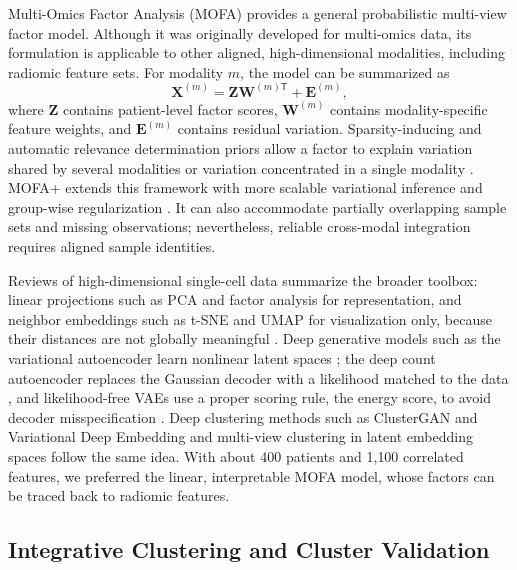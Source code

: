 \documentclass[conference]{IEEEtran}
\begin{document}
Multi-Omics Factor Analysis (MOFA) provides a general probabilistic multi-view factor model. Although it was originally developed for multi-omics data, its formulation is applicable to other aligned, high-dimensional modalities, including radiomic feature sets. For modality $m$, the model can be summarized as
\begin{equation}
    \mathbf{X}^{(m)} = \mathbf{Z}\mathbf{W}^{(m)\mathsf{T}} + \mathbf{E}^{(m)},
\end{equation}
where $\mathbf{Z}$ contains patient-level factor scores, $\mathbf{W}^{(m)}$ contains modality-specific feature weights, and $\mathbf{E}^{(m)}$ contains residual variation. Sparsity-inducing and automatic relevance determination priors allow a factor to explain variation shared by several modalities or variation concentrated in a single modality \cite{argelaguet2018mofa}. MOFA+ extends this framework with more scalable variational inference and group-wise regularization \cite{argelaguet2020mofaplus}. It can also accommodate partially overlapping sample sets and missing observations; nevertheless, reliable cross-modal integration requires aligned sample identities.

Reviews of high-dimensional single-cell data summarize the broader toolbox: linear projections such as PCA and factor analysis for representation, and neighbor embeddings such as t-SNE and UMAP for visualization only, because their distances are not globally meaningful \cite{wu2020tools,zogopoulos2025scrnaseq,vandermaaten2008tsne}. Deep generative models such as the variational autoencoder learn nonlinear latent spaces \cite{kingma2014vae}; the deep count autoencoder replaces the Gaussian decoder with a likelihood matched to the data \cite{eraslan2019dca}, and likelihood-free VAEs use a proper scoring rule, the energy score, to avoid decoder misspecification \cite{xu2025envae}. Deep clustering methods such as ClusterGAN and Variational Deep Embedding \cite{mukherjee2019clustergan,jiang2016variational} and multi-view clustering in latent embedding spaces \cite{chen2020multi} follow the same idea. With about 400 patients and 1{,}100 correlated features, we preferred the linear, interpretable MOFA model, whose factors can be traced back to radiomic features.

\subsection{Integrative Clustering and Cluster Validation}
\end{document}

